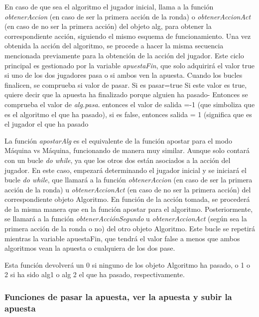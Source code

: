 En caso de que sea el algoritmo el jugador inicial, llama a la función  \textit{obtenerAccion} (en caso de ser la primera acción de la ronda) o  \textit{obtenerAccionAct} (en caso de no ser la primera acción) del objeto alg, para obtener la correspondiente acción, siguiendo el mismo esquema de funcionamiento. Una vez obtenida la acción del algoritmo, se procede a hacer la misma secuencia mencionada previamente para la obtención de la acción del jugador.
Este ciclo principal es gestionado por la variable\textit{ apuestaFin}, que solo adquirirá el valor true si uno de los dos jugadores pasa o si ambos ven la apuesta. 
Cuando los bucles finalicen, se comprueba si valor de pasar. Si es pasar=true  Si este valor es true, quiere decir que la apuesta ha finalizado porque alguien ha pasado- Entonces se comprueba el valor de \textit{alg.pasa}. entonces el valor de salida =-1 (que simboliza que es el algoritmo el que ha pasado), si es false, entonces salida = 1 (significa que es el jugador el que ha pasado

La función \textit{apostarAlg} es el equivalente de la función apostar para el modo Máquina vs Máquina, funcionando de manera muy similar. Aunque solo contará con un bucle\textit{ do while}, ya que los otros dos están asociados a la acción del jugador.
En este caso, empezará determinando el jugador inicial y se iniciará el bucle \textit{do while}, que llamará a la función \textit{obtenerAccion} (en caso de ser la primera acción de la ronda) u \textit{obtenerAccionAct} (en caso de no ser la primera acción) del correspondiente objeto Algoritmo. En función de la acción tomada, se procederá de la misma manera que en la función apostar para el algoritmo. Posteriormente, se llamará a la función \textit{obtenerAcciónSegundo} u \textit{obtenerAccionAct }(según sea la primera acción de la ronda o no) del otro objeto Algoritmo.
Este bucle se repetirá mientras la variable apuestaFin, que tendrá el valor false a menos que ambos algoritmos vean la apuesta o cualquiera de los dos pase.

Esta función devolverá un 0 si ninguno de los objeto Algoritmo ha pasado, o 1 o 2 si ha sido alg1 o alg 2 el que ha pasado, respectivamente.

\subsubsection{Funciones de pasar la apuesta, ver la apuesta y subir la apuesta }

